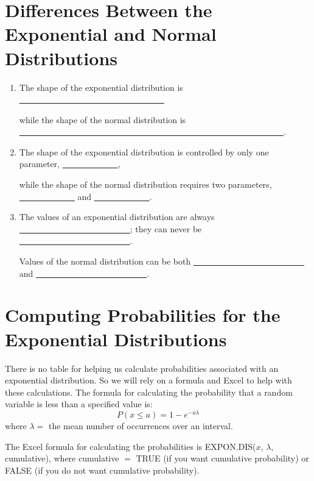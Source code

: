 \documentclass[12pt, letterpaper]{article}
\theoremstyle{definition}
\begin{document}
\section*{Differences Between the Exponential and Normal Distributions}


\begin{enumerate}

\item The shape of the exponential distribution is \underline{~~~~~~~~~~~~~~~~~~~~~~~~~~~~~~~~~~} 

while the shape of the normal distribution is \underline{~~~~~~~~~~~~~~~~~~~~~~~~~~~~~~~~~~~~~~~~~~~~~~~~~~~~~~~~~~~~~~}.


\item The shape of the exponential distribution is controlled by only one parameter, \underline{~~~~~~~~~~~~~}, 

while the shape of the normal distribution requires two parameters, \underline{~~~~~~~~~~~~~} and \underline{~~~~~~~~~~~~~}.


\item The values of an exponential distribution are always \underline{~~~~~~~~~~~~~~~~~~~~~~~~~~};  they can never be \underline{~~~~~~~~~~~~~~~~~~~~~~~~~~}. 

Values of the normal distribution can be both \underline{~~~~~~~~~~~~~~~~~~~~~~~~~~} and \underline{~~~~~~~~~~~~~~~~~~~~~~~~~~}.

\end{enumerate}


\section*{Computing Probabilities for the Exponential Distributions}

\noindent There is no table for helping us calculate probabilities associated with an exponential distribution.  So we will rely on a formula and Excel to help with these calculations.  The formula for calculating the probability that a random variable is less than a specified value is:
$$ P(x\leq a) = 1-e^{-a\lambda} $$
where $\lambda=$ the mean number of occurrences over an interval.




\vspace*{.1in}

The Excel formula for calculating the probabilities is EXPON.DIS($x$, $\lambda$, cumulative), where cumulative $=$ TRUE (if you want cumulative probability) or FALSE (if you do not want cumulative probability).
\end{document}
